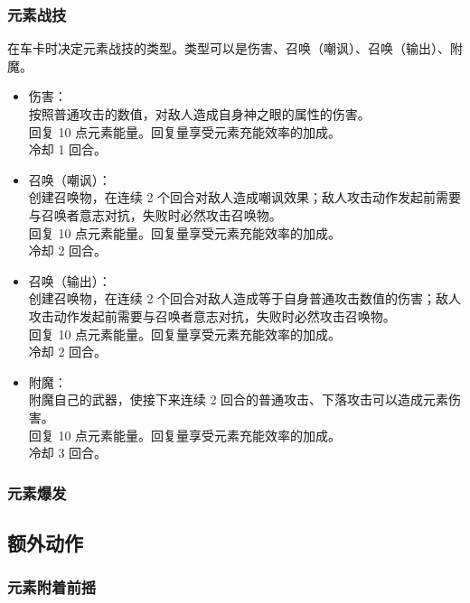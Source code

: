\documentclass[a4paper,12pt]{article}
\begin{document}
    \subsubsection{元素战技}

    在车卡时决定元素战技的类型。类型可以是伤害、召唤（嘲讽）、召唤（输出）、附魔。

    \begin{itemize}
        \item 伤害：\\
                按照普通攻击的数值，对敌人造成自身神之眼的属性的伤害。\\
                回复 10 点元素能量。回复量享受元素充能效率的加成。\\
                冷却 1 回合。
        \item 召唤（嘲讽）：\\
                创建召唤物，在连续 2 个回合对敌人造成嘲讽效果；敌人攻击动作发起前需要与召唤者意志对抗，失败时必然攻击召唤物。\\
                回复 10 点元素能量。回复量享受元素充能效率的加成。\\
                冷却 2 回合。
        \item 召唤（输出）：\\
                创建召唤物，在连续 2 个回合对敌人造成等于自身普通攻击数值的伤害；敌人攻击动作发起前需要与召唤者意志对抗，失败时必然攻击召唤物。\\
                回复 10 点元素能量。回复量享受元素充能效率的加成。\\
                冷却 2 回合。
        \item 附魔：\\
                附魔自己的武器，使接下来连续 2 回合的普通攻击、下落攻击可以造成元素伤害。\\
                回复 10 点元素能量。回复量享受元素充能效率的加成。\\
                冷却 3 回合。
    \end{itemize}

    \subsubsection{元素爆发}
    \subsection{额外动作}
    \subsubsection{元素附着前摇}
\end{document}
